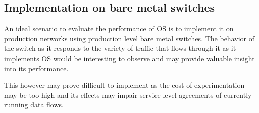 \subsection*{Implementation on bare metal switches}
An ideal scenario to evaluate the performance of OS is to implement it on production networks using production level bare metal switches. The behavior of the switch as it responds to the variety of traffic that flows through it as it implements OS would be interesting to observe and may provide valuable insight into its performance.

This however may prove difficult to implement as the cost of experimentation may be too high and its effects may impair service level agreements of currently running data flows.
